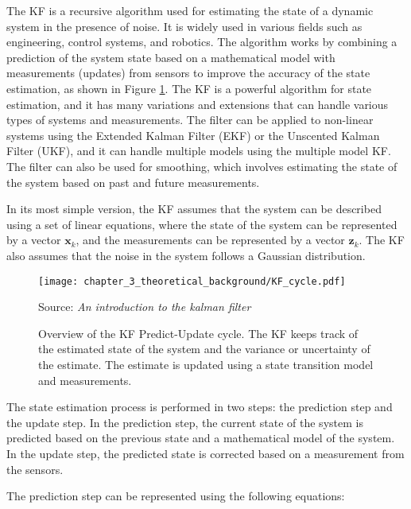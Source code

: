 The \acf{KF} \cite{kalman1960new} is a recursive algorithm used for estimating the state of a dynamic system in the presence of noise. It is widely used in various fields such as engineering, control systems, and robotics. The algorithm works by combining a prediction of the system state based on a mathematical model with measurements (updates) from sensors to improve the accuracy of the state estimation, as shown in Figure \ref{fig:chapter_3_theoretical_background/KF_cycle}. The \ac{KF} is a powerful algorithm for state estimation, and it has many variations and extensions that can handle various types of systems and measurements. The filter can be applied to non-linear systems using the Extended Kalman Filter (EKF) or the Unscented Kalman Filter (UKF), and it can handle multiple models using the multiple model \ac{KF}. The filter can also be used for smoothing, which involves estimating the state of the system based on past and future measurements.

In its most simple version, the \ac{KF} assumes that the system can be described using a set of linear equations, where the state of the system can be represented by a vector $\mathbf{x}_k$, and the measurements can be represented by a vector $\mathbf{z}_k$. The \ac{KF} also assumes that the noise in the system follows a Gaussian distribution.

\begin{figure}[!h]
	\centering
	\captionsetup{justification=justified}
	\texttt{[image: chapter\_3\_theoretical\_background/KF\_cycle.pdf]}
	\caption[Overview of the \ac{KF} Predict-Update cycle]{Overview of the \ac{KF} Predict-Update cycle. The \ac{KF} keeps track of the estimated state of the system and the variance or uncertainty of the estimate. The estimate is updated using a state transition model and measurements.}
	Source: \textit{An introduction to the kalman filter} \cite{bishop2001introduction}
	\label{fig:chapter_3_theoretical_background/KF_cycle}
\end{figure}

The state estimation process is performed in two steps: the prediction step and the update step. In the prediction step, the current state of the system is predicted based on the previous state and a mathematical model of the system. In the update step, the predicted state is corrected based on a measurement from the sensors.

The prediction step can be represented using the following equations:

